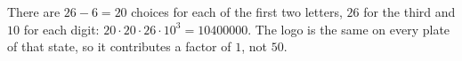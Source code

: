 There are $26-6=20$ choices for each of the first two letters, $26$ for the third and $10$ for each digit: $20\cdot20\cdot26\cdot10^3=\boxed{10400000}$. The logo is the same on every plate of that state, so it contributes a factor of $1$, not $50$.
